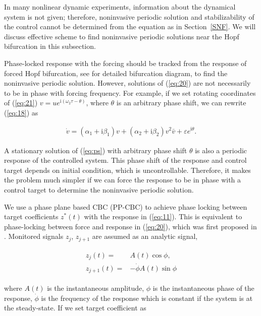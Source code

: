 \documentclass[openacc]{rsproca_new}%
\def\epsilon{\varepsilon}
\newcommand{\Eref}[1]{(\ref{#1})}
\newcommand{\Sref}[1]{Section~\ref{#1}}
\begin{document}
In many nonlinear dynamic experiments, information about the dynamical system is not given; therefore, noninvasive periodic solution and stabilizability of the control cannot be determined from the equation as in \Sref{SNF}. We will discuss effective scheme to find noninvasive periodic solutions near the Hopf bifurcation in this subsection.

Phase-locked response with the forcing should be tracked from the response of forced Hopf bifurcation, see \cite{zhang2011periodically,wiser2015bifurcations} for detailed bifurcation diagram, to find the noninvasive periodic solution. However, solutions of \Eref{eq:20} are not necessarily to be in phase with forcing frequency. For example, if we set rotating coordinates of \Eref{eq:21} $v=ue^{\textrm{i}(\omega_2 \tau-\theta)}$, where $\theta$ is an arbitrary phase shift, we can rewrite \Eref{eq:18}
as

\begin{align}\label{eq:ps}
\dot v=(\alpha_1+\textrm{i}\beta_1)v+(\alpha_2+\textrm{i}\beta_2)v^2 \bar v+\epsilon e^{\textrm{i}\theta}.
\end{align}

\noindent A stationary solution of \Eref{eq:ps} with arbitrary phase shift $\theta$ is also a periodic response of the controlled system. This phase shift of the response and control target depends on initial condition, which is uncontrollable. Therefore, it makes the problem much simpler if we can force the response to be in phase with a control target to determine the noninvasive periodic solution.

We use a phase plane based CBC (PP-CBC) to achieve phase locking between target coefficients $z^*(t)$ with the response in \Eref{eq:11}. This is equivalent to phase-locking between force and response in \Eref{eq:20}, which was first proposed in \cite{irene}. Monitored signals $z_j$, $z_{j+1}$  are assumed as an analytic signal,

\begin{align}\label{eq:25}
\begin{split}
z_{j}(t)=&A(t)\cos{\phi},\\
z_{j+1}(t)=&-\dot\phi A(t)\sin{\phi}
\end{split}
\end{align}

\noindent where $A(t)$ is the instantaneous amplitude, $\phi$ is the instantaneous phase of the response, $\dot\phi$ is the frequency of the response which is constant if the system is at the steady-state. If we set target coefficient as
\end{document}
